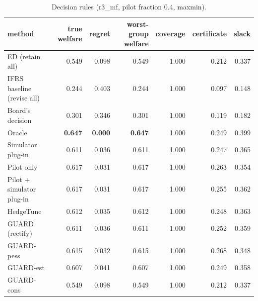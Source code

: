\begin{table}[t]
\centering
\small
\begin{tabular}{lrrrrrr}
\toprule
method & true welfare & regret & worst-group welfare & coverage & certificate & slack \\
\midrule
ED (retain all) & 0.549 & 0.098 & 0.549 & 1.000 & 0.212 & 0.337 \\
IFRS baseline (revise all) & 0.244 & 0.403 & 0.244 & 1.000 & 0.097 & 0.148 \\
Board's decision & 0.301 & 0.346 & 0.301 & 1.000 & 0.119 & 0.182 \\
Oracle & \textbf{0.647} & \textbf{0.000} & \textbf{0.647} & 1.000 & 0.249 & 0.399 \\
Simulator plug-in & 0.611 & 0.036 & 0.611 & 1.000 & 0.247 & 0.365 \\
Pilot only & 0.617 & 0.031 & 0.617 & 1.000 & 0.263 & 0.354 \\
Pilot + simulator plug-in & 0.617 & 0.031 & 0.617 & 1.000 & 0.255 & 0.362 \\
HedgeTune & 0.612 & 0.035 & 0.612 & 1.000 & 0.248 & 0.363 \\
GUARD (rectify) & 0.611 & 0.036 & 0.611 & 1.000 & 0.252 & 0.359 \\
GUARD-pess & 0.615 & 0.032 & 0.615 & 1.000 & 0.268 & 0.348 \\
GUARD-est & 0.607 & 0.041 & 0.607 & 1.000 & 0.249 & 0.358 \\
GUARD-cons & 0.549 & 0.098 & 0.549 & 1.000 & 0.212 & 0.337 \\
\bottomrule
\end{tabular}
\caption{Decision rules (r3\_mf, pilot fraction 0.4, maxmin).}
\label{tab:methods-maxmin}
\end{table}
